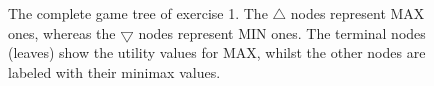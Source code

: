 \begin{figure}[htpb]
\centering
{}
\caption{The complete game tree of exercise 1. The $\bigtriangleup$ nodes represent MAX ones, whereas the $\bigtriangledown$ nodes represent MIN ones. The terminal nodes (leaves) show the utility values for MAX, whilst the other nodes are labeled with their minimax values.}
\label{fig:exercise1}
\end{figure} %